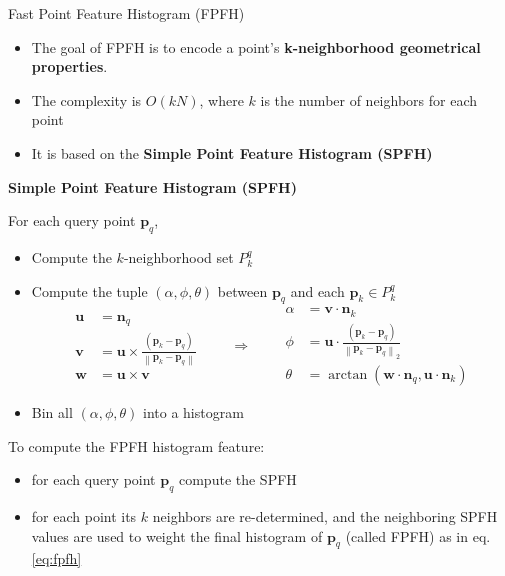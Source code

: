 \documentclass[aspectratio=1610]{beamer}
\renewcommand*{\cite}{\parencite}
\newcommand{\norm}[1]{\left\lVert#1\right\rVert}
\begin{document}

\begin{frame}[allowframebreaks]{Fast Point Feature Histogram (FPFH)}
\begin{itemize}
\item The goal of FPFH is to encode a point's \textbf{k-neighborhood geometrical properties}.
\item The complexity is $O(kN)$, where $k$ is the number of neighbors for each point~\cite{rusu2009fast}
\item It is based on the \textbf{Simple Point Feature Histogram (SPFH)}
\end{itemize}

\framebreak

\textbf{Simple Point Feature Histogram (SPFH)}
\par
For each query point $\bm{p}_q$, 
\begin{itemize}
\item Compute the $k$-neighborhood set $P_k^q$
\item Compute the tuple $(\alpha,\phi,\theta)$ between $\bm{p}_q$ and each $\bm{p}_k\in P_k^q$
\begin{equation}
\begin{array}{ll}
\bm{u} & = \bm{n}_q \\
\bm{v} & = \bm{u} \times \frac{(\bm{p}_k-\bm{p}_q)}{\norm{\bm{p}_k-\bm{p}_q}} \\
\bm{w} & = \bm{u} \times \bm{v}
\end{array}	\qquad \Rightarrow \qquad
\begin{array}{ll}
\alpha & = \bm{v}\cdot\bm{n}_k \\
\phi & = \bm{u} \cdot \frac{(\bm{p}_k-\bm{p}_q)}{\norm{\bm{p}_k-\bm{p}_q}_2} \\
\theta & = \arctan(\bm{w}\cdot\bm{n}_q, \bm{u}\cdot\bm{n}_k)
\end{array}
\end{equation}
\item Bin all $(\alpha,\phi,\theta)$ into a histogram
\end{itemize}

\framebreak

To compute the FPFH histogram feature:
\begin{itemize}
  \item for each query point $\bm{p}_q$ compute the SPFH
  \item for each point its $k$ neighbors are re-determined, and the neighboring SPFH values are used to weight the final histogram of $\bm{p}_q$ (called FPFH) as in eq.\ref{eq:fpfh}
\end{itemize}


\end{frame}
\end{document}
